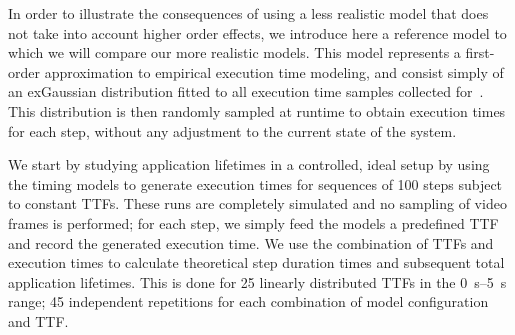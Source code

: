 In order to illustrate the consequences of using a less realistic model that does not take into account higher order effects, we introduce here a reference model to which we will compare our more realistic models.
This model represents a first-order approximation to empirical execution time modeling, and consist simply of an \gls{exGaussian} distribution fitted to all execution time samples collected for~\cite{olguinmunoz2021impact}.
This distribution is then randomly sampled at runtime to obtain execution times for each step, without any adjustment to the current state of the system.

We start by studying application lifetimes in a controlled, ideal setup by using the timing models to generate execution times for sequences of \num{100} steps subject to constant \glspl{TTF}.
These runs are completely simulated and no sampling of video frames is performed; for each step, we simply feed the models a predefined \gls{TTF} and record the generated execution time.
We use the combination of \glspl{TTF} and execution times to calculate theoretical step duration times and subsequent total application lifetimes.
This is done for \num{25} linearly distributed \glspl{TTF} in the \SIrange[]{0}{5}{\second} range; \num{45} independent repetitions for each combination of model configuration and \gls{TTF}.

